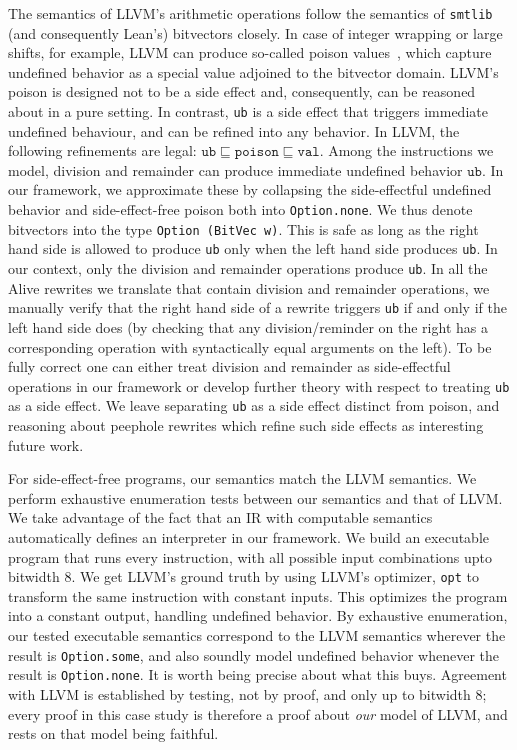 The semantics of LLVM's arithmetic operations follow the semantics of \texttt{smtlib} (and consequently Lean's) bitvectors closely.
In case of integer wrapping or large shifts, for example, LLVM can produce so-called poison values~\cite{lopes2015provably}, which capture undefined behavior as a special value adjoined to the bitvector domain.
LLVM's poison is designed not to be a side effect and, consequently, can be reasoned about in a pure setting.
In contrast, \texttt{ub} is a side effect that triggers immediate undefined behaviour, and can be refined into any behavior.
In LLVM, the following refinements are legal: $\texttt{ub} \sqsubseteq \texttt{poison} \sqsubseteq \texttt{val}$.
Among the instructions we model, division and remainder can produce immediate undefined behavior $\texttt{ub}$.
In our framework, we approximate these by collapsing the side-effectful undefined behavior and side-effect-free poison both into \texttt{Option.none}.
We thus denote bitvectors into the type \texttt{Option (BitVec w)}.
This is safe as long as the right hand side is allowed to produce \texttt{ub} only when the left hand side produces \texttt{ub}.
In our context, only the division and remainder operations produce \texttt{ub}.
In all the Alive rewrites we translate that contain division and remainder operations, we manually verify that the right hand side of a rewrite triggers \texttt{ub} if and only if the left hand side does
(by checking that any division/reminder on the right has a corresponding operation with syntactically equal arguments on the left).
To be fully correct one can either treat division and remainder as side-effectful operations in our framework or develop further theory with respect to treating \texttt{ub} as a side effect. We leave separating \texttt{ub} as a side effect distinct from poison, and reasoning about peephole rewrites which refine such side effects as interesting future work.

For side-effect-free programs, our semantics match the LLVM semantics.
We perform exhaustive enumeration tests between our semantics and that of LLVM.
We take advantage of the fact that an IR with computable semantics automatically defines an interpreter in our framework.
We build an executable program that runs every instruction, with all possible input combinations upto bitwidth $8$.
We get LLVM's ground truth by using LLVM's optimizer, \texttt{opt} to transform the same instruction with constant inputs.
This optimizes the program into a constant output, handling undefined behavior.
By exhaustive enumeration, our tested executable semantics correspond to the LLVM semantics wherever the result is \texttt{Option.some}, and also soundly model undefined behavior whenever the result is \texttt{Option.none}.
It is worth being precise about what this buys. Agreement with LLVM is
established by testing, not by proof, and only up to bitwidth $8$; every proof
in this case study is therefore a proof about \emph{our} model of LLVM, and
rests on that model being faithful.

